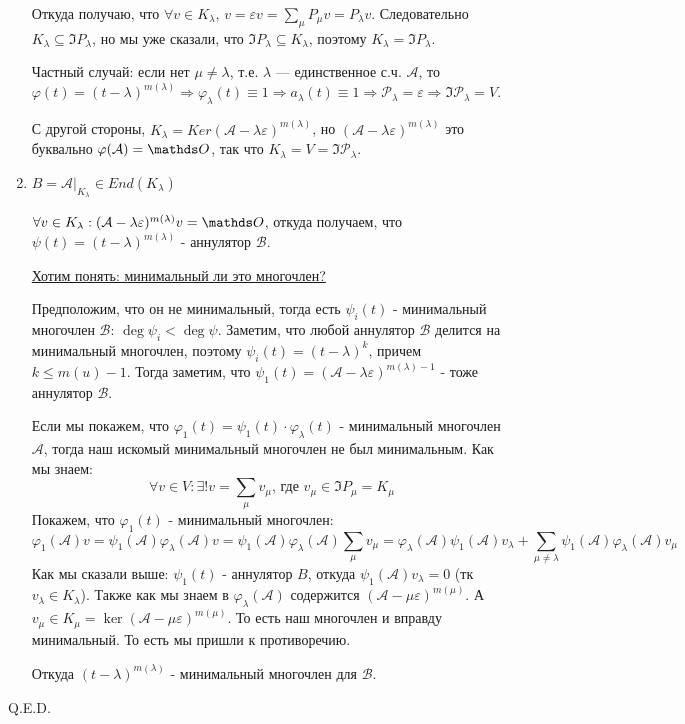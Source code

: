 \begin{enumerate}
    Откуда получаю, что $\forall v \in K_{\lambda}, \, v= \varepsilon v = \sum\limits_{\mu}P_{\mu}v=P_{\lambda}v$. Следовательно $ K_{\lambda }\subseteq \Im P_{\lambda}$, но мы уже сказали, что  $ \Im P_{\lambda} \subseteq K_{\lambda}$, поэтому $ K_{\lambda }= \Im P_{\lambda}$.

    Частный случай: если нет $\mu \ne \lambda$, т.е. $\lambda$ --- единственное с.ч. $\mathcal{A}$, то $\varphi(t) = (t - \lambda)^{m(\lambda)} \Rightarrow \varphi_{\lambda}(t) \equiv 1 \Rightarrow a_{\lambda}(t) \equiv 1 \Rightarrow \mathcal{P}_{\lambda} = \varepsilon \Rightarrow \Im\mathcal{P}_{\lambda} = V$.

    С другой стороны, $K_{\lambda} = Ker(\mathcal{A} - \lambda\varepsilon)^{m(\lambda)}$, но $(\mathcal{A} - \lambda\varepsilon)^{m(\lambda)}$ это буквально $\varphi(\mathcal{A}) = \zero$, так что $K_{\lambda} = V = \Im\mathcal{P}_{\lambda}$.
    

    \item $B = \mathcal{A}\Big|_{K_{\lambda}}\in End(K_{\lambda})$
    
    $\forall v \in K_{\lambda}:(\mathcal{A}-\lambda \varepsilon)^{m(\lambda)}v = \zero$, откуда получаем, что $\psi(t) = (t-\lambda)^{m(\lambda)}$ - аннулятор $\mathcal{B}$. 

    \uline{Хотим понять: минимальный ли это многочлен?} 
    
    Предположим, что он не минимальный, тогда есть $\psi_i(t)$ - минимальный многочлен $\mathcal{B}$: $\deg \psi_i <\deg \psi$. Заметим, что любой аннулятор $\mathcal{B}$ делится на минимальный многочлен, поэтому $\psi_i(t) =(t-\lambda )^{k}$, причем $k \leq m(u)-1$. Тогда заметим, что $\psi_1(t) = (\mathcal{A}-\lambda \varepsilon)^{m(\lambda)-1}$ - тоже аннулятор $\mathcal{B}$. 

    Если мы покажем, что $\varphi_1(t)=\psi_1(t)\cdot \varphi_{\lambda}(t)$ - минимальный многочлен $\mathcal{A}$, тогда наш искомый минимальный многочлен не был минимальным. Как мы знаем:
    $$\forall v \in V: \exists! v =\sum\limits_{\mu} v_{\mu}\text{, где }v_{\mu}\in \Im P_\mu =  K_\mu$$
    Покажем, что $\varphi_1(t)$ - минимальный многочлен:
$$\varphi_1(\mathcal{A})v=\psi_1(\mathcal{A}) \varphi_{\lambda}(\mathcal{A})v = \psi_1(\mathcal{A}) \varphi_{\lambda}(\mathcal{A})\sum\limits_{\mu} v_{\mu} = \varphi_{\lambda}(\mathcal{A})\psi_1(\mathcal{A})v_\lambda + \sum\limits_{\mu\neq \lambda}\psi_1(\mathcal{A}) \varphi_{\lambda}(\mathcal{A}) v_{\mu}$$
Как мы сказали выше: $\psi_1(t)$ - аннулятор $B$, откуда $\psi_1(\mathcal{A})v_{\lambda} = 0$ (тк $v_\lambda \in K_\lambda$). Также как мы знаем в $\varphi_\lambda(\mathcal{A})$ содержится $(\mathcal{A}-\mu\varepsilon)^{m(\mu)}$. А $v_{\mu} \in K_{\mu} = \ker (\mathcal{A}-\mu\varepsilon)^{m(\mu)}$. То есть наш многочлен и вправду минимальный. То есть мы пришли к противоречию. 

Откуда $(t-\lambda)^{m(\lambda)}$ - минимальный многочлен для $\mathcal{B}$.
    
\end{enumerate}
 \hfill Q.E.D.

